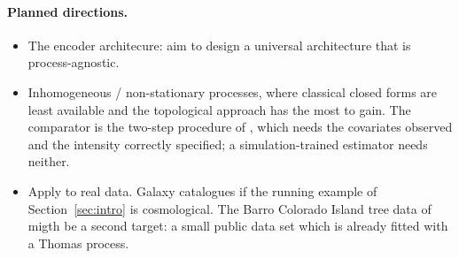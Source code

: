\documentclass[11pt,a4paper]{article}
\theoremstyle{definitioncolon}
\begin{document}
\paragraph{Planned directions.}
\begin{itemize}[leftmargin=*,itemsep=2pt]
    \item The encoder architecure: aim to design a universal architecture
    that is process-agnostic.
    \item Inhomogeneous / non-stationary processes, where
    classical closed forms are least available and the topological approach has
    the most to gain. The comparator is the two-step procedure of
    \citet{waagepetersen2009twostep}, which needs the covariates observed and the
    intensity correctly specified; a simulation-trained estimator needs neither.
    \item Apply to real data. Galaxy catalogues if the running
    example of Section~\ref{sec:intro} is cosmological.
    The Barro Colorado Island tree data of \citet{waagepetersen2009twostep}
    migth be a second target: a small  public data set which is already fitted with a Thomas
    process.
\end{itemize}
\end{document}
